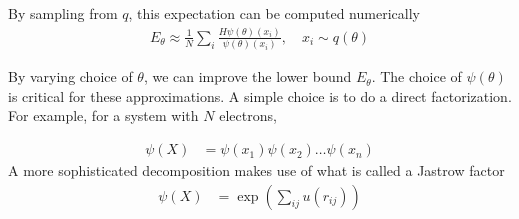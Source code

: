 \documentclass[book.tex]{subfiles}
\begin{document}
By sampling from $q$, this expectation can be computed numerically
\begin{align}
    E_\theta \approx \frac{1}{N} \sum_i \frac{H\psi(\theta)(x_i)}{\psi(\theta)(x_i)}, \quad x_i \sim q(\theta)
\end{align}

By varying choice of $\theta$, we can improve the lower bound $E_\theta$. The choice of $\psi(\theta)$ is critical for these approximations. A simple choice is to do a direct factorization. For example, for a system with $N$ electrons,

\begin{align}
    \psi(X) &= \psi(x_1)\psi(x_2)\dotsc \psi(x_n)
\end{align}
A more sophisticated decomposition makes use of what is called a Jastrow factor
\begin{align}
    \psi(X) &= \exp \left ( \sum_{ij} u(r_{ij}) \right )
\end{align}


\end{document}
